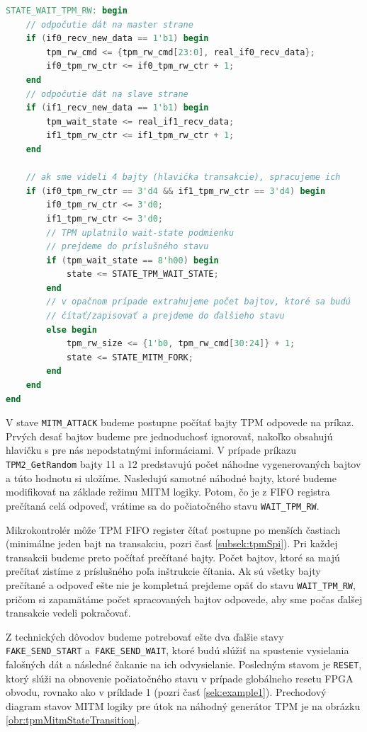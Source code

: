 \begin{lstlisting}[float,language=Verilog,caption={Logika stavu \texttt{WAIT\_TPM\_RW}.},label=snip:tpmRwState]
STATE_WAIT_TPM_RW: begin
    // odpočutie dát na master strane
    if (if0_recv_new_data == 1'b1) begin
        tpm_rw_cmd <= {tpm_rw_cmd[23:0], real_if0_recv_data};
        if0_tpm_rw_ctr <= if0_tpm_rw_ctr + 1;
    end
    // odpočutie dát na slave strane
    if (if1_recv_new_data == 1'b1) begin
        tpm_wait_state <= real_if1_recv_data;
        if1_tpm_rw_ctr <= if1_tpm_rw_ctr + 1;
    end
    
    // ak sme videli 4 bajty (hlavička transakcie), spracujeme ich
    if (if0_tpm_rw_ctr == 3'd4 && if1_tpm_rw_ctr == 3'd4) begin
        if0_tpm_rw_ctr <= 3'd0;
        if1_tpm_rw_ctr <= 3'd0;
        // TPM uplatnilo wait-state podmienku
        // prejdeme do príslušného stavu
        if (tpm_wait_state == 8'h00) begin
            state <= STATE_TPM_WAIT_STATE;
        end
        // v opačnom prípade extrahujeme počet bajtov, ktoré sa budú
        // čítať/zapisovať a prejdeme do ďalšieho stavu
        else begin
            tpm_rw_size <= {1'b0, tpm_rw_cmd[30:24]} + 1;
            state <= STATE_MITM_FORK;
        end
    end
end
\end{lstlisting}

V stave \texttt{MITM\_ATTACK} budeme postupne počítať bajty TPM odpovede na príkaz. Prvých desať bajtov budeme pre jednoduchosť ignorovať, nakoľko obsahujú hlavičku s pre nás nepodstatnými informáciami. V prípade príkazu \texttt{TPM2\_GetRandom} bajty 11 a 12 predstavujú počet náhodne vygenerovaných bajtov a túto hodnotu si uložíme. Nasledujú samotné náhodné bajty, ktoré budeme modifikovať na základe režimu MITM logiky. Potom, čo je z FIFO registra prečítaná celá odpoveď, vrátime sa do počiatočného stavu \texttt{WAIT\_TPM\_RW}.

Mikrokontrolér môže TPM FIFO register čítať postupne po menších častiach (minimálne jeden bajt na transakciu, pozri časť \ref{subsek:tpmSpi}). Pri každej transakcii budeme preto počítať prečítané bajty. Počet bajtov, ktoré sa majú prečítať zistíme z príslušného poľa inštrukcie čítania. Ak sú všetky bajty prečítané a odpoveď ešte nie je kompletná prejdeme opäť do stavu \texttt{WAIT\_TPM\_RW}, pričom si zapamätáme počet spracovaných bajtov odpovede, aby sme počas ďalšej transakcie vedeli pokračovať.

Z technických dôvodov budeme potrebovať ešte dva ďalšie stavy \texttt{FAKE\_SEND\_START} a~\texttt{FAKE\_SEND\_WAIT}, ktoré budú slúžiť na spustenie vysielania falošných dát a následné čakanie na ich odvysielanie. Posledným stavom je \texttt{RESET}, ktorý slúži na obnovenie počiatočného stavu v prípade globálneho resetu FPGA obvodu, rovnako ako v príklade 1 (pozri časť \ref{sek:example1}). Prechodový diagram stavov MITM logiky pre útok na náhodný generátor TPM je na obrázku \ref{obr:tpmMitmStateTransition}.

